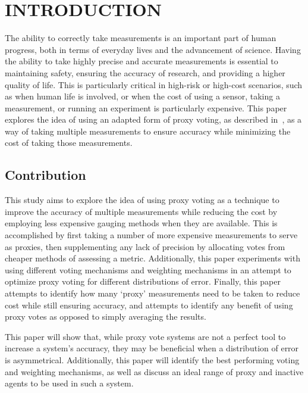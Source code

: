 %
%

\chapter{INTRODUCTION}\label{ch:introduction}
\thispagestyle{empty}

The ability to correctly take measurements is an important part of human
progress, both in terms of everyday lives and the advancement of science.
Having the ability to take highly precise and accurate measurements is essential
to maintaining safety, ensuring the accuracy of research, and providing a
higher quality of life.
This is particularly critical in high-risk or high-cost scenarios, such as when
human life is involved, or when the cost of using a sensor, taking a
measurement, or running an experiment is particularly expensive.
This paper explores the idea of using an adapted form of proxy voting, as
described in~\cite[para.~1.3]{Miller1969}, as a way of taking multiple
measurements to ensure accuracy while minimizing the cost of taking those
measurements.

\section{Contribution}\label{sec:contribution}
This study aims to explore the idea of using proxy voting as a technique to
improve the accuracy of multiple measurements while reducing the cost by
employing less expensive gauging methods when they are available.
This is accomplished by first taking a number of more expensive measurements to
serve as proxies, then supplementing any lack of precision by allocating
votes from cheaper methods of assessing a metric.
Additionally, this paper experiments with using different voting mechanisms and
weighting mechanisms in an attempt to optimize proxy voting for different
distributions of error.
Finally, this paper attempts to identify how many `proxy' measurements need
to be taken to reduce cost while still ensuring accuracy, and attempts to
identify any benefit of using proxy votes as opposed to simply averaging the
results.

This paper will show that, while proxy vote systems are not a perfect tool to
increase a system's accuracy, they may be beneficial when a distribution of error is
asymmetrical.
Additionally, this paper will identify the best performing voting and weighting
mechanisms, as well as discuss an ideal range of proxy and inactive agents to be used
in such a system.


